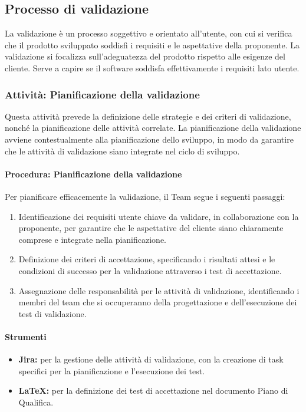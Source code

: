 \documentclass[a4paper,12pt]{article}
\begin{document}
\subsection{Processo di validazione}
La validazione è un processo soggettivo e orientato all'utente, con cui si verifica che il prodotto sviluppato
soddisfi i requisiti e le aspettative della proponente. La validazione si
focalizza sull'adeguatezza del prodotto rispetto alle esigenze del cliente. Serve a capire
se il software soddisfa effettivamente i requisiti lato utente.

\subsubsection{Attività: Pianificazione della validazione}
Questa attività prevede la definizione delle strategie e dei criteri di
validazione, nonché la pianificazione delle attività correlate. La
pianificazione della validazione avviene contestualmente alla pianificazione
dello sviluppo, in modo da garantire che le attività di validazione siano
integrate nel ciclo di sviluppo.

\paragraph{Procedura: Pianificazione della validazione}
Per pianificare efficacemente la validazione, il Team segue i seguenti
passaggi:
\begin{enumerate}
    \item Identificazione dei requisiti utente chiave da validare, in collaborazione con la
          proponente, per garantire che le aspettative del cliente siano chiaramente
          comprese e integrate nella pianificazione.
    \item Definizione dei criteri di accettazione, specificando i
          risultati attesi e le condizioni di successo per la validazione attraverso i test di accettazione.
    \item Assegnazione delle responsabilità per le attività di validazione, identificando
          i membri del team che si occuperanno della progettazione e dell'esecuzione dei
          test di validazione.
\end{enumerate}

\paragraph{Strumenti}
\begin{itemize}
    \item \textbf{Jira:} per la gestione delle attività di validazione, con la creazione di task specifici per la pianificazione e l'esecuzione dei test.
    \item \textbf{\LaTeX:} per la definizione dei test di accettazione nel documento Piano di Qualifica.
\end{itemize}
\end{document}
